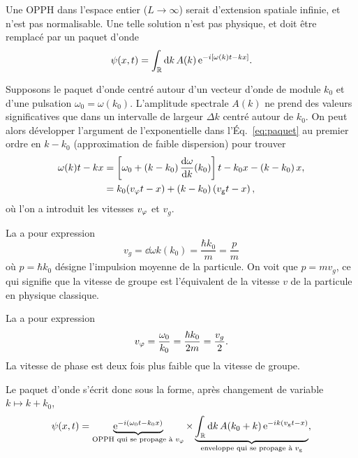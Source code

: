 \documentclass[12pt,fancy]{cours}
\begin{document}
Une OPPH dans l’espace entier ($L\rightarrow \infty$) serait d'extension spatiale infinie, et n’est pas normalisable. Une telle solution n’est pas physique, et doit être remplacé par un paquet d'onde
\begin{equation}
\label{eq:paquet}
 \psi(x,t)=\int_{\mathbb{R}} \mathrm{d} k \,A(k)\,\mathrm{e}^{-i[\omega(k)t-kx]}.
 \end{equation}

Supposons le paquet d'onde centré autour d'un vecteur d’onde de module $k_0$ et d’une pulsation $\omega_0 = \omega(k_0)$. L’amplitude spectrale $A(k)$ ne prend des valeurs significatives que dans un intervalle de largeur $\Delta k$ centré autour de $k_0$. On peut alors développer l'argument de l'exponentielle dans l'Éq.~\eqref{eq:paquet} au premier ordre en $k-k_0$ (approximation de faible dispersion) pour trouver
\begin{equation}
\begin{aligned}
\omega(k)t - k x &=\left[\omega_0+\left(k-k_0\right)\frac{\mathrm{d}{\omega}}{\mathrm{d}{k}}(k_0)\right]t - k_0 x - \left(k-k_0\right)x ,\\
&= k_0(v_\varphi t- x) + \left(k-k_0\right)\left(v_\mathrm{g} t-x\right),
\end{aligned}
\end{equation}
où l’on a introduit les vitesses $v_\varphi$ et $v_g$.
\begin{liste}
   \item La  a pour expression
  \begin{equation}
    v_g = \dd{\omega}{k}(k_0) = \frac{\hbar k_0}{m} = \frac{p}{m}
  \end{equation}
  où $p=\hbar k_0$ désigne l’impulsion moyenne de la particule. On voit que $p=mv_g$, ce qui signifie que la vitesse de groupe est l’équivalent de la vitesse $v$ de la particule en physique classique.
  \item La  a pour expression
  \begin{equation}
    v_\varphi = \frac{\omega_0}{k_0} = \frac{\hbar k_0}{2m} = \frac{v_g}{2}.
  \end{equation}
  La vitesse de phase est deux fois plus faible que la vitesse de groupe.
\end{liste}
Le paquet d'onde s'écrit donc sous la forme, après changement de variable $k \mapsto k+k_0$,
\begin{equation}
\psi(x,t)=\underbrace{\mathrm{e}^{-i\left(\omega_0 t - k_0 x\right)}}_{\text{OPPH qui se propage à~} v_{\varphi}}\times\underbrace{\int_{\mathbb{R}}\mathrm{d} k \, A(k_0+ k)\,\mathrm{e}^{-i k\left(v_\mathrm{g}t - x\right)}}_{\text{enveloppe qui se propage à~} v_{\rm{g}}},
\end{equation}
\end{document}
